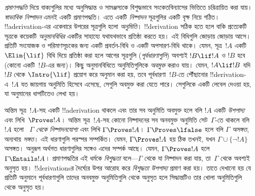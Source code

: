 \emph{প্রমাণপদ্ধতি} দিয়ে বাক্যগুলির মধ্যে অনুসিদ্ধান্ত ও
সামঞ্জস্যকে বিশুদ্ধভাবে সংকেতবিন্যাসের ভিত্তিতে চরিত্রায়িত করা
যায়। \emph{স্বাভাবিক নিষ্পাদন} এমনই একটি প্রমাণপদ্ধতি।
এতে একটি \emph{নিষ্পাদন} সূত্রগুলির একটি বৃক্ষ নিয়ে গঠিত।
!!a{derivation}-এর একেবারে উপরের সূত্রগুলি হলো \emph{অনুমিতি}।
!!{derivation} সঠিক হতে হলে বাকি প্রত্যেকটি সূত্রকে কয়েকটি
\emph{অনুমানবিধির} একটির সাহায্যে যথাযথভাবে প্রতিষ্ঠা করতে হয়।
এই বিধিগুলি জোড়ায় জোড়ায় আসে। প্রতিটি সংযোজক ও পরিমাণসূচকের
জন্য একটি প্রবর্তন-বিধি ও একটি অপসারণ-বিধি থাকে। যেমন, সূত্র~$!A$
একটি $\Elim{\lif}$ বিধি দিয়ে প্রতিষ্ঠা করা হলে আগের সূত্রগুলি
(\emph{পূর্বধারণাগুলি}) অবশ্যই $!B \lif !A$ ও $!B$ হবে
(কোনো একটি~$!B$-এর জন্য)। কিছু অনুমানবিধিতে অনুমিতিগুলিকে
\emph{অবমুক্ত} করাও যায়। যেমন, $!A \lif !B$ যদি $!B$ থেকে
$\Intro{\lif}$ প্রয়োগ করে অনুমান করা হয়, তবে পূর্বধারণা~$!B$-তে পৌঁছানোর
!!{derivation}-এ~$!A$ যত জায়গায় অনুমিতি হিসেবে এসেছে,
সেগুলি অবমুক্ত করা যেতে পারে। সেগুলিকে একটি লেবেল দেওয়া হয়,
যা অনুমানের ধাপটিতেও লেখা হয়।

অন্তিম সূত্র~$!A$-সহ একটি !!a{derivation} থাকলে এবং তার সব
অনুমিতি অবমুক্ত হলে বলি $!A$ একটি \emph{উপপাদ্য} এবং লিখি~$\Proves !A$।
অন্তিম সূত্র~$!A$-সহ কোনো নিষ্পাদনের সব অনবমুক্ত অনুমিতি সেট~$\Gamma$-তে
থাকলে বলি $!A$ হলো
~$\Gamma$ \emph{থেকে নিষ্পাদনযোগ্য} এবং লিখি $\Gamma \Proves !A$।
$\Gamma \Proves \lfalse$ হলে বলি $\Gamma$ \emph{অসঙ্গত}, অন্যথায়
\emph{সঙ্গত}। এই ধারণাগুলি পরস্পর সম্পর্কিত। যেমন,
$\Gamma \Proves !A$ হয় ঠিক তখনই, যখন $\Gamma \cup \{\lnot !A\}$
অসঙ্গত। অনুরূপ অর্থগত ধারণাগুলির সঙ্গেও এদের সম্পর্ক আছে। যেমন,
$\Gamma \Proves !A$ হলে $\Gamma \Entails !A$। প্রমাণপদ্ধতির এই
ধর্মকে \emph{বিশুদ্ধতা} বলে—$\Gamma$ থেকে যা নিষ্পাদন করা যায়,
তা~$\Gamma$ থেকে অবশ্যই অনুসৃত হয়। !!{derivation}sর দৈর্ঘ্যের উপর
আরোহ করে \emph{বিশুদ্ধতা উপপাদ্য} প্রমাণ করা হয়। তাতে দেখানো হয়
যে প্রতিটি অনুমানে পূর্বধারণাগুলি তাদের অনবমুক্ত অনুমিতিগুলি থেকে
অনুসৃত হলে সিদ্ধান্তটিও তার খোলা অনুমিতিগুলি থেকে অনুসৃত হয়।
